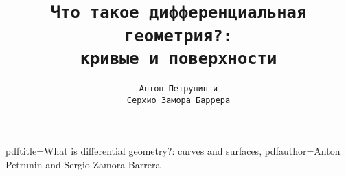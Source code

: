 \hypersetup
{
pdftitle={What is differential geometry?: curves and surfaces},
pdfauthor={Anton Petrunin and Sergio Zamora Barrera}
}

\title{\tt Что такое дифференциальная геометрия?:\\
кривые и поверхности}

\author{\tt Антон Петрунин и \\ \tt  Серхио Замора Баррера}

\date{}

\maketitle

\thispagestyle{empty}
